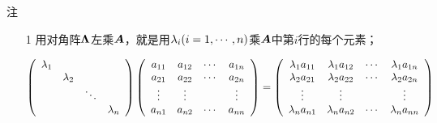\begin{frame}
  \begin{footnotesize}
    \begin{block}{注}
      \begin{itemize}
      \item[1] 用对角阵$\boldsymbol{\Lambda}$左乘$\boldsymbol{A}$，就是用$\lambda_i(i=1,\cdots,n)$乘$\boldsymbol{A}$中第$i$行的每个元素；
        \pause 
      \item[]
        \begin{scriptsize}
          $$
          \left(
            \begin{array}{cccc}
              \lambda_1 & & &\\
                        & \lambda_2 & & \\
                        & & \ddots & \\
                        & & & \lambda_n
            \end{array}
          \right)
          \left(
            \begin{array}{cccc}
              a_{11} & a_{12} & \cdots & a_{1n}\\
              a_{21} & a_{22} & \cdots & a_{2n}\\
              \vdots & \vdots &  & \vdots\\
              a_{n1} & a_{n2} & \cdots & a_{nn}
            \end{array}
          \right) = 
          \left(
            \begin{array}{cccc}
              \lambda_1 a_{11} & \lambda_1a_{12} & \cdots & \lambda_1a_{1n}\\
              \lambda_2a_{21} & \lambda_2a_{22} & \cdots & \lambda_2a_{2n}\\
              \vdots & \vdots &  & \vdots\\
              \lambda_na_{n1} & \lambda_na_{n2} & \cdots & \lambda_na_{nn}
            \end{array}
          \right)
          $$


\end{scriptsize}
\end{itemize}
\end{block}
\end{footnotesize}
\end{frame}
